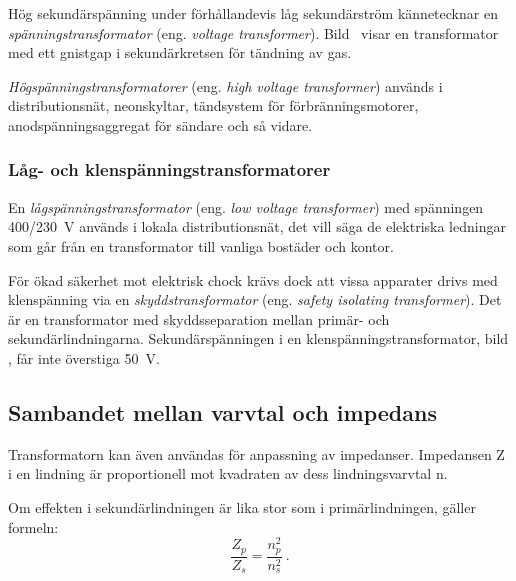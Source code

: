 Hög sekundärspänning under förhållandevis låg sekundärström kännetecknar en
\emph{spänningstransformator} (eng. \emph{voltage transformer}).
Bild~ visar en transformator med ett gnistgap i
sekundärkretsen för tändning av gas.

\emph{Högspänningstransformatorer} (eng. \emph{high voltage transformer})
används i distributionsnät, neonskyltar, tändsystem för förbränningsmotorer,
anodspänningsaggregat för sändare och så vidare.


\newpage
\subsubsection{Låg- och klenspänningstransformatorer}


En \emph{lågspänningstransformator} (eng. \emph{low voltage transformer}) med
spänningen 400/\qty{230}{\volt} används i lokala distributionsnät, det vill säga
de elektriska ledningar som går från en transformator till vanliga bostäder och
kontor.

För ökad säkerhet mot elektrisk chock krävs dock att vissa apparater drivs med
klenspänning via en \emph{skyddstransformator}
(eng. \emph{safety isolating transformer}).
Det är en transformator med skyddsseparation mellan primär- och
sekundärlindningarna.
Sekundärspänningen i en klenspänningstransformator, bild ,
får inte överstiga \qty{50}{\volt}.

\newpage
\subsection{Sambandet mellan varvtal och impedans}


Transformatorn kan även användas för anpassning av impedanser.
Impedansen Z i en lindning är proportionell mot kvadraten av dess
lindningsvarvtal n.

Om effekten i sekundärlindningen är lika stor som i primärlindningen, gäller
formeln:
%
\[\dfrac{Z_p}{Z_s} = \dfrac{n_p^2}{n_s^2}~.\]
